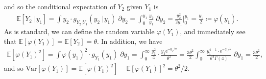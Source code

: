 \documentclass[10pt]{article}
\begin{document}
and so the conditional expectation of \(Y_2\) given \(Y_1\) is 
\begin{align*}
    \mathbb{E}[Y_2 \,|\, y_1] 
    = \int y_2 \cdot g_{Y_2|Y_1}(y_2 \,|\, y_1) \;\partial y_2
    = \int_0^{y_1} \frac{y_2}{y_1} \;\partial y_2
    = \frac{y_2^2}{2 y_1} \bigg|_0^{y_1}
    = \frac{y_1}{2}
    \coloneqq \varphi(y_1).
\end{align*}
As is standard, we can define the random variable \(\varphi(Y_1)\), and immediately see that \(\mathbb{E}[\varphi(Y_1)] = \mathbb{E}[Y_2] = \theta\). 
In addition, we have 
\begin{align*}
    \mathbb{E}[\varphi(Y_1)^2]
    = \int \varphi(y_1)^2 \cdot g_{Y_1}(y_1) \;\partial y_1
    = \int_0^{\infty} \frac{y_1^2}{4} \cdot \frac{y_1 \mathrm{e}^{- y_1 / \theta}}{\theta^2}
    = \frac{3\theta^2}{2} \int_0^{\infty} \frac{y_1^{4 - 1} \cdot \mathrm{e}^{- y_1 / \theta}}{\theta^4 \Gamma(4)} \;\partial y_1
    = \frac{3\theta^2}{2},
\end{align*}
and so \(\mathrm{Var}[\varphi(Y_1)] = \mathbb{E}[\varphi(Y_1)^2] - \mathbb{E}[\varphi(Y_1)]^2 = \theta^2 / 2\). 

\end{document}
